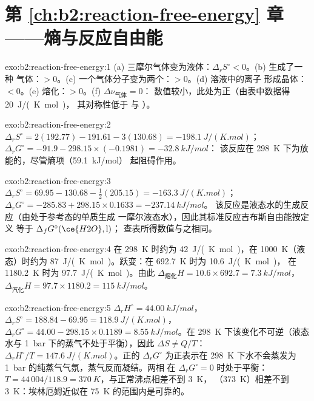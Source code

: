 \section*{第 \ref{ch:b2:reaction-free-energy} 章——熵与反应自由能}

\begin{solution}{exo:b2:reaction-free-energy:1}
(a) 三摩尔气体变为液体：$\Delta_r S^\circ < 0$。(b) 生成了一种
气体：$> 0$。(c) 一个气体分子变为两个：$> 0$。(d) 溶液中的离子
形成晶体：$< 0$。(e) 熔化：$> 0$。(f) $\Delta\nu_{\text{气体}} = 0$：
数值较小，此处为正（由表中数据得 \qty{+20}{J/(K.mol)}，
其对称性低于  与 ）。
\end{solution}

\begin{solution}{exo:b2:reaction-free-energy:2}
$\Delta_r S^\circ = 2(192.77) - 191.61 - 3(130.68) = \qty{-198.1}{J/(K.mol)}$；
$\Delta_r G^\circ = -91.9 - 298.15 \times (-0.1981) = \qty{-32.8}{kJ/mol}$：
该反应在 \qty{298}{K} 下为放能的，尽管熵项（\qty{+59.1}{kJ/mol}）
起阻碍作用。
\end{solution}

\begin{solution}{exo:b2:reaction-free-energy:3}
$\Delta_r S^\circ = 69.95 - 130.68 - \tfrac12(205.15) = \qty{-163.3}{J/(K.mol)}$；
$\Delta_r G^\circ = -285.83 + 298.15 \times 0.1633 = \qty{-237.14}{kJ/mol}$。
该反应是液态水的生成反应（由处于参考态的单质生成
一摩尔液态水），因此其标准反应吉布斯自由能按定义
等于 $\Delta_f G^\circ(\ce{H2O}, \text{l})$；
查表所得数值与之相同。
\end{solution}

\begin{solution}{exo:b2:reaction-free-energy:4}
在 \qty{298}{K} 时约为 \qty{42}{J/(K.mol)}，在
\qty{1000}{K}（液态）时约为 \qty{87}{J/(K.mol)}。跃变：在 \qty{692.7}{K} 时为 \qty{10.6}{J/(K.mol)}，
在 \qty{1180.2}{K} 时为 \qty{97.7}{J/(K.mol)}。由此 $\Delta_{\text{熔化}}H = 10.6 \times
692.7 = \qty{7.3}{kJ/mol}$，$\Delta_{\text{汽化}}H = 97.7 \times 1180.2 =
\qty{115}{kJ/mol}$。
\end{solution}

\begin{solution}{exo:b2:reaction-free-energy:5}
$\Delta_r H^\circ = \qty{44.00}{kJ/mol}$，$\Delta_r S^\circ = 188.84 - 69.95 =
\qty{118.9}{J/(K.mol)}$，$\Delta_r G^\circ = 44.00 - 298.15 \times 0.1189 =
\qty{+8.55}{kJ/mol}$。在 \qty{298}{K} 下该变化不可逆（液态
水与 \qty{1}{bar} 下的蒸气不处于平衡），因此 $\Delta S \ne
Q/T$：$\Delta_r H^\circ/T = \qty{147.6}{J/(K.mol)}$。正的
$\Delta_r G^\circ$ 为正表示在 \qty{298}{K} 下水不会蒸发为
\qty{1}{bar} 的纯蒸气气氛，蒸气反而凝结。两相
在 $\Delta_r G^\circ = 0$ 时处于平衡：$T = 44\,004/118.9 =
\qty{370}{K}$，与正常沸点相差不到 \qty{3}{K}，
（\qty{373}{K}）相差不到 \qty{3}{K}：埃林厄姆近似在 \qty{75}{K} 的范围内是可靠的。
\end{solution}

